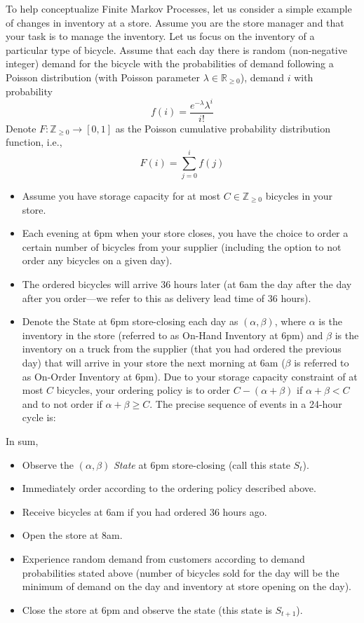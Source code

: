 \begin{appendices}

To help conceptualize Finite Markov Processes, let us consider a simple example of changes in inventory at a store. Assume you are the store manager and that your task is to manage the inventory. Let us focus on the inventory of a particular type of bicycle. Assume that each day there is random (non-negative integer) demand for the bicycle with the probabilities of demand following a Poisson distribution (with Poisson parameter $\lambda \in \mathbb{R}_{\geq 0}$), \ie demand $i$ with probability
$$f(i) = \frac {e^{-\lambda} \lambda^i} {i!}$$
Denote $F: \mathbb{Z}_{\geq 0} \rightarrow [0, 1]$ as the Poisson cumulative probability distribution function, i.e.,
 $$F(i) = \sum_{j=0}^i f(j)$$
 \begin{itemize}
	 \item Assume you have storage capacity for at most $C \in \mathbb{Z}_{\geq 0}$ bicycles in your store. 
	 \item Each evening at 6pm when your store closes, you have the choice to order a certain number of bicycles from your supplier (including the option to not order any bicycles on a given day). 
	 \item The ordered bicycles will arrive 36 hours later (at 6am the day after the day after you order—we refer to this as delivery lead time of 36 hours). 
	 \item Denote the State at 6pm store-closing each day as $(\alpha, \beta)$, where $\alpha$ is the inventory in the store (referred to as On-Hand Inventory at 6pm) and $\beta$ is the inventory on a truck from the supplier (that you had ordered the previous day) that will arrive in your store the next morning at 6am ($\beta$ is referred to as On-Order Inventory at 6pm). Due to your storage capacity constraint of at most $C$ bicycles, your ordering policy is to order $C-(\alpha + \beta)$ if $\alpha + \beta < C$ and to not order if $\alpha + \beta \geq C$. The precise sequence of events in a 24-hour cycle is:
 \end{itemize}
 
In sum,
\begin{itemize}
	\item Observe the $(\alpha, \beta)$ \textit{State} at 6pm store-closing (call this state $S_t$).
	\item Immediately order according to the ordering policy described above.
	\item Receive bicycles at 6am if you had ordered 36 hours ago.
	\item Open the store at 8am.
	\item Experience random demand from customers according to demand probabilities stated above (number of bicycles sold for the day will be the minimum of demand on the day and inventory at store opening on the day).
	\item Close the store at 6pm and observe the state (this state is $S_{t+1}$).
\end{itemize}


\end{appendices}
